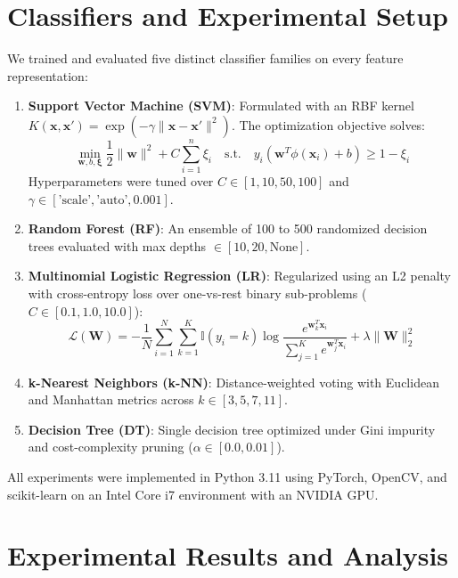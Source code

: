 \documentclass[conference]{IEEEtran}
\begin{document}
\section{Classifiers and Experimental Setup}
\label{sec:classifiers}
We trained and evaluated five distinct classifier families on every feature representation:
\begin{enumerate}
    \item \textbf{Support Vector Machine (SVM)}: Formulated with an RBF kernel $K(\mathbf{x}, \mathbf{x}') = \exp(-\gamma \|\mathbf{x} - \mathbf{x}'\|^2)$. The optimization objective solves:
    \begin{equation}
    \min_{\mathbf{w}, b, \boldsymbol{\xi}} \frac{1}{2} \|\mathbf{w}\|^2 + C \sum_{i=1}^{n} \xi_i \quad \text{s.t.} \quad y_i(\mathbf{w}^T \phi(\mathbf{x}_i) + b) \ge 1 - \xi_i
    \end{equation}
    Hyperparameters were tuned over $C \in [1, 10, 50, 100]$ and $\gamma \in [\text{'scale'}, \text{'auto'}, 0.001]$.
    \item \textbf{Random Forest (RF)}: An ensemble of 100 to 500 randomized decision trees evaluated with max depths $\in [10, 20, \text{None}]$.
    \item \textbf{Multinomial Logistic Regression (LR)}: Regularized using an L2 penalty with cross-entropy loss over one-vs-rest binary sub-problems ($C \in [0.1, 1.0, 10.0]$):
    \begin{equation}
    \mathcal{L}(\mathbf{W}) = -\frac{1}{N} \sum_{i=1}^N \sum_{k=1}^K \mathbb{I}(y_i = k) \log \frac{e^{\mathbf{w}_k^T \mathbf{x}_i}}{\sum_{j=1}^K e^{\mathbf{w}_j^T \mathbf{x}_i}} + \lambda \|\mathbf{W}\|_2^2
    \end{equation}
    \item \textbf{k-Nearest Neighbors (k-NN)}: Distance-weighted voting with Euclidean and Manhattan metrics across $k \in [3, 5, 7, 11]$.
    \item \textbf{Decision Tree (DT)}: Single decision tree optimized under Gini impurity and cost-complexity pruning ($\alpha \in [0.0, 0.01]$).
\end{enumerate}

All experiments were implemented in Python 3.11 using PyTorch, OpenCV, and scikit-learn on an Intel Core i7 environment with an NVIDIA GPU.

\section{Experimental Results and Analysis}
\label{sec:results}
\end{document}
